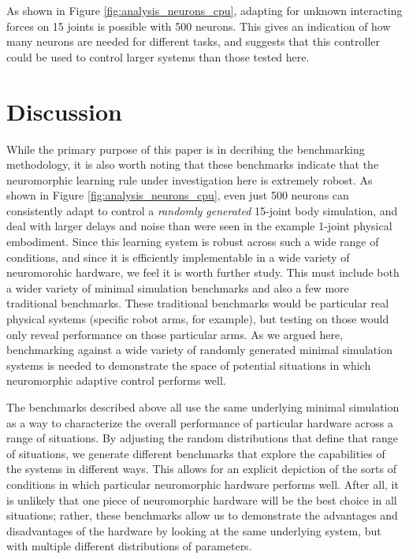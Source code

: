 \documentclass{frontiersSCNS} %
\begin{document}
As shown in Figure \ref{fig:analysis_neurons_cpu}, adapting for unknown
interacting forces on 15 joints is possible with 500 neurons.  This gives
an indication of how many neurons are needed for different tasks, and suggests
that this controller could be used to control larger systems than those tested here.

\section{Discussion}

While the primary purpose of this paper is in decribing the benchmarking
methodology, it is also worth noting that these benchmarks indicate
that the neuromorphic learning rule under investigation here is extremely robost.  As
shown in Figure \ref{fig:analysis_neurons_cpu}, even just 500 neurons can consistently
adapt to control a \emph{randomly generated} 15-joint body simulation, and
deal with larger delays and noise than were seen in the example 1-joint
physical embodiment.  Since this learning system is robust across such a
wide range of conditions, and since it is efficiently implementable in a
wide variety of neuromorohic hardware, we feel it is worth further study.  This must include 
both a wider variety of minimal simulation benchmarks and also a few more 
traditional benchmarks.  These traditional
benchmarks would be particular real physical systems (specific robot arms,
for example), but testing on those would only reveal performance on those
particular arms.  As we argued here, benchmarking against a wide variety of 
randomly generated minimal simulation systems is needed to demonstrate the
space of potential situations in which neuromorphic adaptive control performs well.

The benchmarks described above all use the same underlying minimal simulation
as a way to characterize the overall performance of particular hardware
across a range of situations.  By adjusting the random distributions that
define that range of situations, we generate different benchmarks that
explore the capabilities of the systems in different ways.  This allows for
an explicit depiction of the sorts of conditions in which particular
neuromorphic hardware performs well.  After all, it is unlikely that one
piece of neuromorphic hardware will be the best choice in all situations;
rather, these benchmarks allow us to demonstrate the advantages and disadvantages
of the hardware by looking at the same underlying system, but with multiple
different distributions of parameters.
\end{document}

